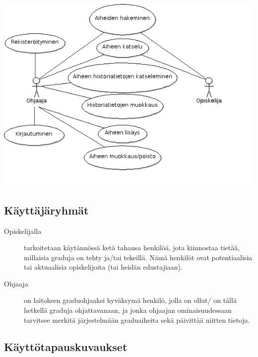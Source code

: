 \documentclass[11pt,a4paper,finnish,oneside]{article}
\begin{document}
\includegraphics [width=6in]{useCase1.png}
\vspace{2em}

\subsection{Käyttäjäryhmät}
\begin{par}
\begin{description}
\item[Opiskelijalla]tarkoitetaan käytännössä ketä tahansa henkilöä, jota kiinnostaa tietää, millaisia graduja on tehty ja/tai tekeillä. Nämä henkilöt ovat potentiaalisia tai aktuaalisia opiskelijoita (tai heidän edustajiaan).
\item[Ohjaaja] on laitoksen graduohjaaksi hyväksymä henkilö, jolla on ollut/ on tällä hetkellä graduja ohjattavanaan, ja jonka ohjaajan ominaisuudessaan tarvitsee merkitä järjestelmään graduaiheita sekä päivittää niitten tietoja.
\end{description}
\end{par}
\subsection*{Käyttötapauskuvaukset}
\end{document}
